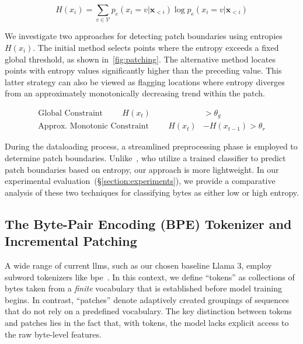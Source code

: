 \begin{equation}
H(x_i) = \sum_{v \in \mathcal{V}} p_{e}(x_i=v|\pmb{x}_{<i}) \log p_{e}(x_i=v|\pmb{x}_{<i})
\end{equation}

We investigate two approaches for detecting patch boundaries using entropies $H(x_i)$. The initial method selects points where the entropy exceeds a fixed global threshold, as shown in~\autoref{fig:patching}. The alternative method locates points with entropy values significantly higher than the preceding value. This latter strategy can also be viewed as flagging locations where entropy diverges from an approximately monotonically decreasing trend within the patch.

\begin{align*}
    \text{Global Constraint}\hspace{1cm}H(x_t)& > \theta_g\\
    \text{Approx. Monotonic Constraint}\hspace{1cm}H(x_t)& - H(x_{t-1}) > \theta_r
\end{align*}

During the dataloading process, a streamlined preprocessing phase is employed to determine patch boundaries. Unlike~\citet{nawrot-etal-2023-efficient}, who utilize a trained classifier to predict patch boundaries based on entropy, our approach is more lightweight. In our experimental evaluation~(\S\ref{section:experiments}), we provide a comparative analysis of these two techniques for classifying bytes as either low or high entropy.

\subsection{The Byte-Pair Encoding (BPE) Tokenizer and Incremental Patching}
\label{section:incremental-patching}
\label{section:bpe-patch}

A wide range of current llms, such as our chosen baseline Llama 3, employ subword tokenizers like bpe~\citep{gage1994new, sennrich-etal-2016-neural}. In this context, we define ``tokens'' as collections of bytes taken from a \textit{finite} vocabulary that is established before model training begins. In contrast, ``patches'' denote adaptively created groupings of sequences that do not rely on a predefined vocabulary. The key distinction between tokens and patches lies in the fact that, with tokens, the model lacks explicit access to the raw byte-level features.

